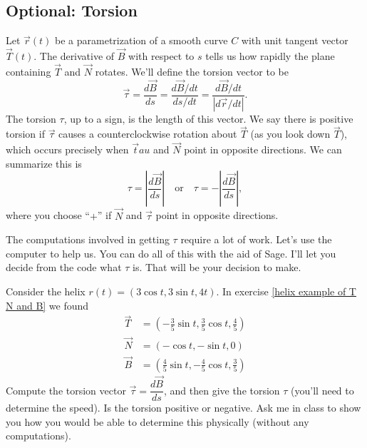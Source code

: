 \subsection*{Optional: Torsion}


\begin{definition}[Torsion]
 Let $\vec r(t)$ be a parametrization of a smooth curve $C$ with unit tangent vector $\vec T(t)$.  
 The derivative of $\vec B$ with respect to $s$ tells us how rapidly the plane containing $\vec T$ and $\vec N$ rotates. We'll define the torsion vector to be 
%
 $$\vec \tau = \dfrac{d\vec B}{ds} = \dfrac{d\vec B/dt}{ds/dt}=\dfrac{d\vec B/dt}{|d\vec r/dt|}.$$ 
 The torsion $\tau$, up to a sign, is the length of this vector. We say there is positive torsion if $\vec \tau$ causes a counterclockwise rotation about $\vec T$ (as you look down $\vec T$), which occurs precisely when $\vec tau$ and $\vec N$ point in opposite directions. We can summarize this is $$\tau=\left|\dfrac{d\vec B}{ds}\right|\quad \text{or}\quad \tau=-\left|\dfrac{d\vec B}{ds}\right|,$$ where you choose ``$+$'' if $\vec N$ and $\vec \tau$ point in opposite directions. 
\end{definition}


The computations involved in getting $\tau$ require a lot of work. Let's use the computer to help us. You can do all of this with the aid of Sage.  I'll let you decide from the code what $\tau$ is.  That will be your decision to make. 

\begin{problem*}[Optional]
%
Consider the helix $r(t)=(3\cos t, 3\sin t, 4t)$. In exercise \ref{helix example of T N and B} we found 
\begin{align*}
 \vec T &= (-\frac{3}{5}\sin t,\frac{3}{5}\cos t,\frac{4}{5})\\
 \vec N &= (-\cos t,-\sin t,0)\\
 \vec B &= (\frac{4}{5}\sin t,-\frac{4}{5}\cos t,\frac{3}{5})
\end{align*}
Compute the torsion vector $\vec \tau=\dfrac{d\vec B}{ds}$, and then give the torsion $\tau$ (you'll need to determine the speed).  Is the torsion positive or negative.  Ask me in class to show you how you would be able to determine this physically (without any computations).
\end{problem*}

